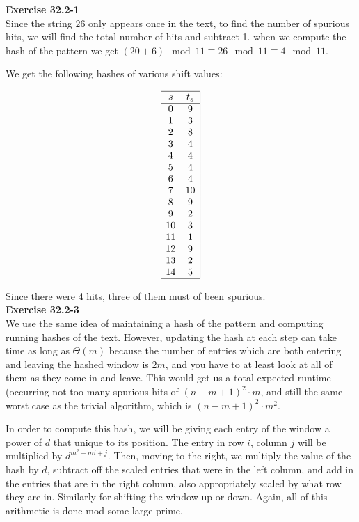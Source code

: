\documentclass{article}
\begin{document}
\noindent\textbf{Exercise 32.2-1}\\

Since the string $26$ only appears once in the text, to find the number of spurious hits, we will find the total number of hits and subtract 1. when we compute the hash of the pattern we get $(20 + 6)\mod 11 \equiv 26\mod 11 \equiv 4\mod 11$.

We get the following hashes of various shift values:

\[
\begin{array}{|cc|}
\hline 
s&t_s\\
\hline
0&9\\
1&3\\
2&8\\
3&4\\
4&4\\
5&4\\
6&4\\
7&10\\
8&9\\
9&2\\
10&3\\
11&1\\
12&9\\
13&2\\
14&5\\
\hline
\end{array}
\]

Since there were 4 hits, three of them must of been spurious.\\



\noindent\textbf{Exercise 32.2-3}\\

We use the same idea of maintaining a hash of the pattern and computing running hashes of the text. However, updating the hash at each step can take time as long as $\Theta(m)$ because the number of entries which are both entering and leaving the hashed window is $2m$, and you have to at least look at all of them as they come in and leave. This would get us a total expected runtime (occurring not too many spurious hits of $(n-m+1)^2\cdot m$, and still the same worst case as the trivial algorithm, which is $(n-m+1)^2 \cdot m^2$.

In order to compute this hash, we will be giving each entry of the window a power of $d$ that unique to its position. The entry in row $i$, column $j$ will be multiplied by $d^{m^2 - mi + j}$. Then, moving to the right, we multiply the value of the hash by $d$, subtract off the scaled entries that were in the left column, and add in the entries that are in the right column, also appropriately scaled by what row they are in. Similarly for shifting the window up or down. Again, all of this arithmetic is done mod some large prime.\\
\end{document}
